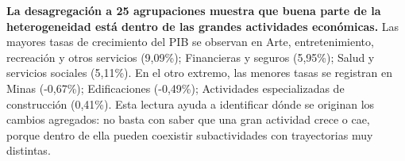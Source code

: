 \textbf{La desagregación a 25 agrupaciones muestra que buena parte de la heterogeneidad está dentro de las grandes actividades económicas.} Las mayores tasas de crecimiento del PIB se observan en Arte, entretenimiento, recreación y otros servicios (9,09\%); Financieras y seguros (5,95\%); Salud y servicios sociales (5,11\%). En el otro extremo, las menores tasas se registran en Minas (-0,67\%); Edificaciones (-0,49\%); Actividades especializadas de construcción (0,41\%). Esta lectura ayuda a identificar dónde se originan los cambios agregados: no basta con saber que una gran actividad crece o cae, porque dentro de ella pueden coexistir subactividades con trayectorias muy distintas.
